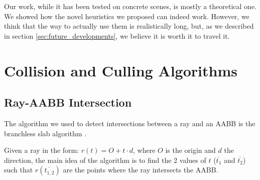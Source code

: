\documentclass{PoliMi_MasterThesis}
\begin{document}
Our work, while it has been tested on concrete scenes, is mostly a theoretical one. We showed how the novel heuristics we proposed can indeed work. However, we think that the way to actually use them is realistically long, but, as we described in section \ref{sec:future_developments}, we believe it is worth it to travel it.




\cleardoublepage
{} %
\appendix

\chapter{Collision and Culling Algorithms}
\section{Ray-AABB Intersection} \label{sec:ray_box_intersection}
The algorithm we used to detect intersections between a ray and an AABB is the branchless slab algorithm \cite{ray_box_intersection}.

Given a ray in the form: $r(t) = O + t\cdot d$, where $O$ is the origin and $d$ the direction, the main idea of the algorithm is to find the 2 values of $t$ ($\overline{t_1}$ and $\overline{t_2}$) such that $r(\overline{t_{1,2}})$ are the points where the ray intersects the AABB.
\end{document}
